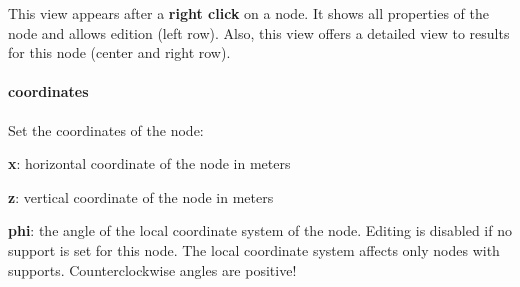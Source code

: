 \documentclass[a4paper,11pt]{report}
\begin{document}
\begin{figure}[H]
\end{figure}

This view appears after a \textbf{right click} on a node. It shows all properties of the node and allows edition (left row). Also, this view offers a detailed view to results for this node (center and right row).

\paragraph{coordinates}
Set the coordinates of the node:
\begin{trivlist}
	\leftskip=1cm
	\item[]\textbf{x}: horizontal coordinate of the node in meters
	\item[]\textbf{z}: vertical coordinate of the node in meters
	\item[]\textbf{phi}: the angle of the local coordinate system of the node. Editing is disabled if no support is set for this node. The local coordinate system affects only nodes with supports. Counterclockwise angles are positive!
\end{trivlist}
\end{document}
